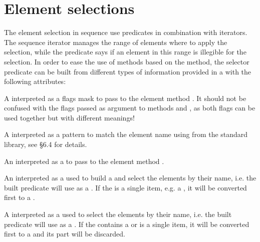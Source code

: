\documentclass[letterpaper,10pt,english]{sphinxmanual}
\begin{document}
\section{Element selections}
\label{\detokenize{sequences:element-selections}}
\sphinxAtStartPar
The element selection in sequence use predicates in combination with iterators. The sequence iterator manages the range of elements where to apply the selection,
while the predicate says if an element in this range is illegible for the selection. In order to ease the use of methods based on the  method,
the selector predicate  can be built from different types of information provided in a  with the following attributes:
\begin{description}
\sphinxAtStartPar
A  interpreted as a flags mask to pass to the element method . It should not be confused with the flags passed as argument to methods
 and , as both flags can be used together but with different meanings!

\sphinxAtStartPar
A  interpreted as a pattern to match the element name using  from the standard library, see
 \S{}6.4 for details.

\sphinxAtStartPar
An  interpreted as a  to pass to the element method .

\sphinxAtStartPar
An  interpreted as a  used to build a  and select the elements by their name, i.e. the built predicate will use 
as a . If the  is a single item, e.g. a , it will be converted first to a .

\sphinxAtStartPar
A  interpreted as a  used to select the elements by their name, i.e. the built predicate will use  as a .
If the  contains a  or is a single item, it will be converted first to a  and its  part will be discarded.


\end{description}
\end{document}
